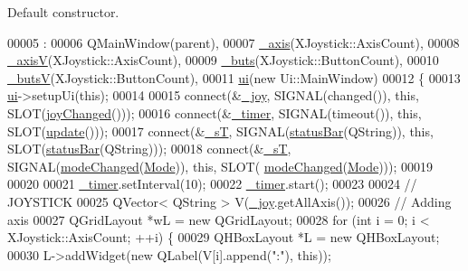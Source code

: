Default constructor. 


\begin{DoxyCode}
00005                                       :
00006     QMainWindow(parent),
00007     \hyperlink{a00005_a30c99d7a544f74b0650758e5cc7ead5a}{\_axis}(XJoystick::AxisCount),
00008     \hyperlink{a00005_a20f66f574ed4c96d8dfc0013e1095f15}{\_axisV}(XJoystick::AxisCount),
00009     \hyperlink{a00005_a8eaf474e1b8672f32873ed009e28ce8a}{\_buts}(XJoystick::ButtonCount),
00010     \hyperlink{a00005_a519ae4630572cb63fbd04bce12fe8e77}{\_butsV}(XJoystick::ButtonCount),
00011     \hyperlink{a00005_a35466a70ed47252a0191168126a352a5}{ui}(\textcolor{keyword}{new} Ui::MainWindow)
00012 \{
00013     \hyperlink{a00005_a35466a70ed47252a0191168126a352a5}{ui}->setupUi(\textcolor{keyword}{this});
00014     
00015     connect(&\hyperlink{a00005_a671f35800890e518713e1946671d8730}{\_joy}, SIGNAL(changed()), \textcolor{keyword}{this}, SLOT(\hyperlink{a00005_abb4c2d8a79c9f80010ea031366bf8226}{joyChanged}()));
00016     connect(&\hyperlink{a00005_a254b03b878cfda75c1c411a2f8568d33}{\_timer}, SIGNAL(timeout()), \textcolor{keyword}{this}, SLOT(\hyperlink{a00005_a128f71880d4b9683149023fc46fcc9f8}{update}()));
00017     connect(&\hyperlink{a00005_a97f8ecc7ecb930b796178cef7b975013}{\_sT}, SIGNAL(\hyperlink{a00005_a22eed58c97536fba6f7b3576ba5a5906}{statusBar}(QString)), \textcolor{keyword}{this}, SLOT(\hyperlink{a00005_a22eed58c97536fba6f7b3576ba5a5906}{statusBar}(QString)));
00018     connect(&\hyperlink{a00005_a97f8ecc7ecb930b796178cef7b975013}{\_sT}, SIGNAL(\hyperlink{a00005_ac5254b38dd1e34b14e2539905c64e2d8}{modeChanged}(\hyperlink{a00005_a372482d77430e41c5483ab8605eece9d}{Mode})), \textcolor{keyword}{this}, SLOT(
      \hyperlink{a00005_ac5254b38dd1e34b14e2539905c64e2d8}{modeChanged}(\hyperlink{a00005_a372482d77430e41c5483ab8605eece9d}{Mode})));
00019     
00020     
00021     \hyperlink{a00005_a254b03b878cfda75c1c411a2f8568d33}{\_timer}.setInterval(10);
00022     \hyperlink{a00005_a254b03b878cfda75c1c411a2f8568d33}{\_timer}.start();
00023     
00024     \textcolor{comment}{// JOYSTICK}
00025     QVector< QString > V(\hyperlink{a00005_a671f35800890e518713e1946671d8730}{\_joy}.getAllAxis());
00026     \textcolor{comment}{// Adding axis}
00027     QGridLayout *wL = \textcolor{keyword}{new} QGridLayout;
00028     \textcolor{keywordflow}{for} (\textcolor{keywordtype}{int} i = 0; i < XJoystick::AxisCount; ++i) \{
00029         QHBoxLayout *L = \textcolor{keyword}{new} QHBoxLayout;
00030         L->addWidget(\textcolor{keyword}{new} QLabel(V[i].append(\textcolor{stringliteral}{":"}), \textcolor{keyword}{this}));

\end{DoxyCode}
